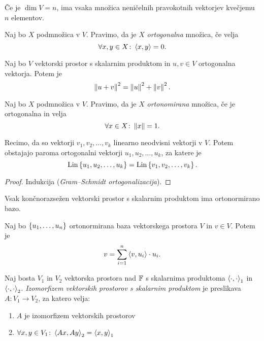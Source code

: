 \documentclass[12pt, a4paper]{article}
\begin{document}
\begin{posledica}
Če je $\dim V=n$, ima vsaka množica neničelnih pravokotnih vektorjev kvečjemu $n$ elementov.
\end{posledica}

\begin{definicija}
Naj bo $X$ podmnožica v $V$. Pravimo, da je $X$ \emph{ortogonalna} množica, če velja
\[
\forall x,y\in X\colon \left\langle x,y\right\rangle=0.
\]
\end{definicija}

\begin{izrek}[Pitagora]
Naj bo $V$ vektorski prostor s skalarnim produktom in $u,v\in V$ ortogonalna vektorja. Potem je
\[
\left\lVert u+v\right\rVert^2=\left\lVert u\right\rVert^2+\left\lVert v\right\rVert^2.
\]
\end{izrek}

\obvs

\begin{definicija}
Naj bo $X$ podmnožica v $V$. Pravimo, da je $X$ \emph{ortonomirana} množica, če je ortogonalna in velja
\[
\forall x\in X\colon \left\lVert x\right\rVert=1.
\]
\end{definicija}

\begin{izrek}
Recimo, da so vektorji $v_1,v_2,\dots,v_k$ linearno neodvisni vektorji v $V$. Potem obstajajo paroma ortogonalni vektorji $u_1,u_2,\dots,u_k$, za katere je
\[
\operatorname{Lin}\left\{u_1,u_2,\dots,u_k\right\}=\operatorname{Lin}\left\{v_1,v_2,\dots,v_k\right\}.
\]
\end{izrek}

\begin{proof}
Indukcija (\emph{Gram--Schmidt ortogonalizacija}).
\end{proof}

\begin{posledica}
Vsak končnorazsežen vektorski prostor s skalarnim produktom ima ortonormirano bazo.
\end{posledica}

\begin{trditev}
Naj bo $\left\{u_1,\dots,u_n\right\}$ ortonormirana baza vektorskega prostora $V$ in $v\in V$. Potem je
\[
v=\sum_{i=1}^n\left\langle v,u_i\right\rangle\cdot u_i.
\]
\end{trditev}

\obvs

\begin{definicija}
Naj bosta $V_1$ in $V_2$ vektorska prostora nad $\mathbb{F}$ s skalarnima produktoma $\left\langle \cdot,\cdot\right\rangle_1$ in $\left\langle \cdot,\cdot\right\rangle_2$. \emph{Izomorfizem vektorskih prostorov s skalarnim produktom} je preslikava $A\colon V_1\to V_2$, za katero velja:

\begin{enumerate}[label=\roman*)]
\item $A$ je izomorfizem vektorskih prostorov
\item $\forall x,y\in V_1\colon \left\langle Ax,Ay\right\rangle_2=\left\langle x,y\right\rangle_1$
\end{enumerate}
\end{definicija}
\end{document}
